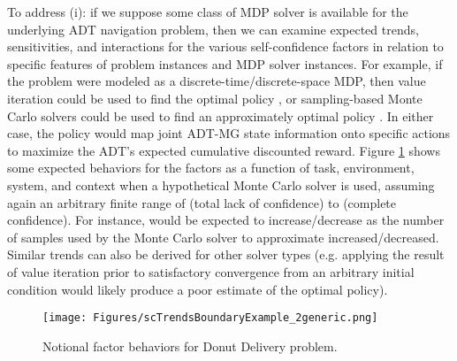 To address (i): if we suppose some class of MDP solver is available for the underlying ADT navigation problem, then we can examine expected trends, sensitivities, and interactions for the various self-confidence factors in relation to specific features of problem instances and MDP solver instances. 
For example, if the problem were modeled  as a discrete-time/discrete-space MDP, then value iteration could be used to find the optimal policy \policyopt, or sampling-based Monte Carlo solvers could be used to find an approximately optimal policy \policy{}  \cite{Browne2012-lj}. In either case, the policy would map joint ADT-MG state information onto specific actions to maximize the ADT's expected cumulative discounted reward.  
Figure \ref{fig:trendsBCs} shows some expected behaviors for the \famsec{} factors as a function of task, environment, system, and context when a hypothetical Monte Carlo solver is used, assuming again an arbitrary finite range of \flow{} (total lack of confidence) to \fup{} (complete confidence). For instance, \xQ{} would be expected to increase/decrease as the number of samples used by the Monte Carlo solver to approximate \policyopt{} increased/decreased. Similar trends can also be derived for other solver types (e.g. applying the result of value iteration prior to satisfactory convergence from an arbitrary initial condition would likely produce a poor estimate of the optimal policy). %
\begin{figure}[tbp]
    \centering
    \texttt{[image: Figures/scTrendsBoundaryExample\_2generic.png]}
    \caption{Notional \famsec{} factor behaviors for Donut Delivery problem.  }
    \label{fig:trendsBCs}
    \vspace{-0.5 cm}
\end{figure}


